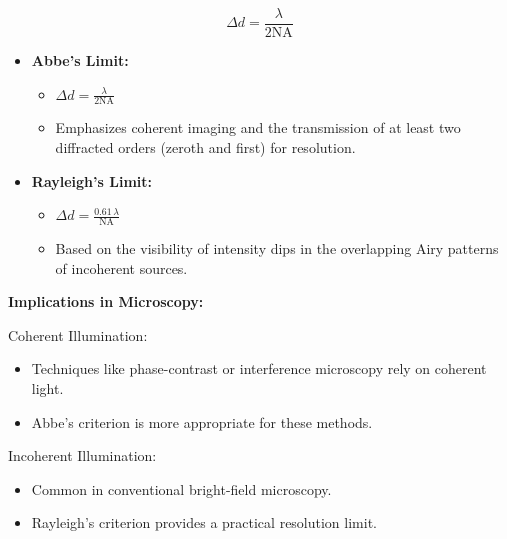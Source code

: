 \documentclass[
  a4paper,
]{book}
\providecommand{\tightlist}{%
  \setlength{\itemsep}{0pt}\setlength{\parskip}{0pt}}
\begin{document}
\[
\Delta d = \frac{\lambda}{2 \text{NA}}
\]

\begin{tcolorbox}[enhanced jigsaw, coltitle=black, title=\textcolor{quarto-callout-note-color}{\faInfo}\hspace{0.5em}{Rayleigh's and Abbe's criteria}, colframe=quarto-callout-note-color-frame, toprule=.15mm, opacitybacktitle=0.6, left=2mm, opacityback=0, breakable, toptitle=1mm, bottomtitle=1mm, leftrule=.75mm, arc=.35mm, titlerule=0mm, colbacktitle=quarto-callout-note-color!10!white, rightrule=.15mm, bottomrule=.15mm, colback=white]

\begin{itemize}
\item
  \textbf{Abbe's Limit:}

  \begin{itemize}
  \tightlist
  \item
    \(\Delta d = \frac{\lambda}{2 \text{NA}}\)
  \item
    Emphasizes coherent imaging and the transmission of at least two
    diffracted orders (zeroth and first) for resolution.
  \end{itemize}
\item
  \textbf{Rayleigh's Limit:}

  \begin{itemize}
  \tightlist
  \item
    \(\Delta d = \frac{0.61\, \lambda}{\text{NA}}\)
  \item
    Based on the visibility of intensity dips in the overlapping Airy
    patterns of incoherent sources.
  \end{itemize}
\end{itemize}

\textbf{Implications in Microscopy:}

Coherent Illumination:

\begin{itemize}
\tightlist
\item
  Techniques like phase-contrast or interference microscopy rely on
  coherent light.
\item
  Abbe's criterion is more appropriate for these methods.
\end{itemize}

Incoherent Illumination:

\begin{itemize}
\tightlist
\item
  Common in conventional bright-field microscopy.
\item
  Rayleigh's criterion provides a practical resolution limit.
\end{itemize}


\end{tcolorbox}
\end{document}
